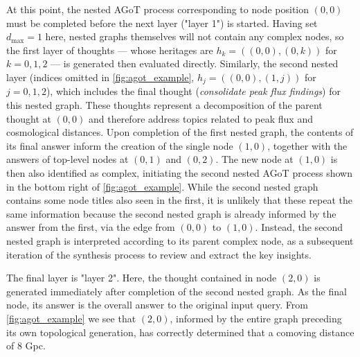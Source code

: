 \documentclass{article}
\begin{document}
At this point, the nested AGoT process corresponding to node position $(0,0)$ must be completed before the next layer ("layer 1") is started. Having set $d_\text{max} = 1$ here, nested graphs themselves will not contain any complex nodes, so the first layer of thoughts --- whose heritages are $h_k = ((0,0), (0,k))$ for $k=0,1,2$ --- is generated then evaluated directly. Similarly, the second nested layer (indices omitted in \autoref{fig:agot_example}, $h_j = ((0, 0), (1, j))$ for $j=0,1,2$), which includes the final thought (\textit{consolidate peak flux findings}) for this nested graph. These thoughts represent a decomposition of the parent thought at $(0,0)$ and therefore address topics related to peak flux and cosmological distances. Upon completion of the first nested graph, the contents of its final answer inform the creation of the single node $(1,0)$, together with the answers of top-level nodes at $(0,1)$ and $(0,2)$. The new node at $(1,0)$ is then also identified as complex, initiating the second nested AGoT process shown in the bottom right of \autoref{fig:agot_example}. While the second nested graph contains some node titles also seen in the first, it is unlikely that these repeat the same information because the second nested graph is already informed by the answer from the first, via the edge from $(0,0)$ to $(1,0)$. Instead, the second nested graph is interpreted according to its parent complex node, as a subsequent iteration of the synthesis process to review and extract the key insights.

The final layer is "layer 2". Here, the thought contained in node $(2,0)$ is generated immediately after completion of the second nested graph. As the final node, its answer is the overall answer to the original input query. From \autoref{fig:agot_example} we see that $(2,0)$, informed by the entire graph preceding its own topological generation, has correctly determined that a comoving distance of 8 Gpc.



\end{document}
